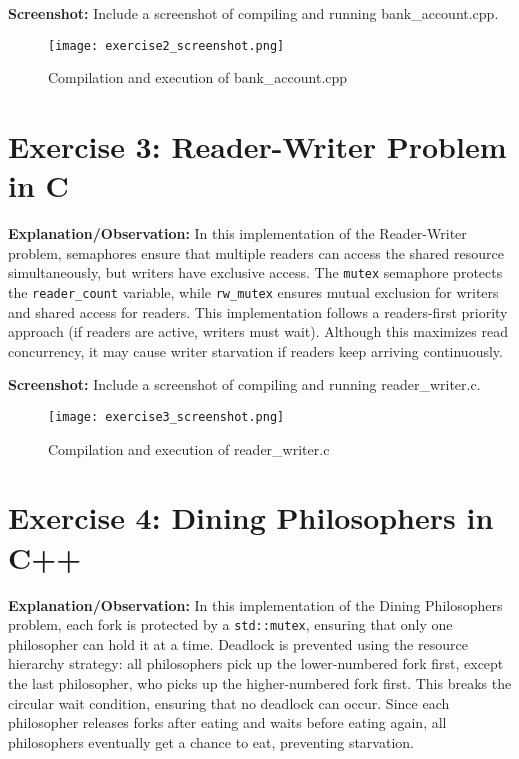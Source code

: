 \documentclass{article}
\begin{document}
\textbf{Screenshot:} Include a screenshot of compiling and running bank\_account.cpp.
\begin{figure}[h]
\centering
\texttt{[image: exercise2\_screenshot.png]}
\caption{Compilation and execution of bank\_account.cpp}
\end{figure}

\section{Exercise 3: Reader-Writer Problem in C}


\textbf{Explanation/Observation:}  
In this implementation of the Reader-Writer problem, semaphores ensure that multiple readers can access the shared resource simultaneously, but writers have exclusive access. The \texttt{mutex} semaphore protects the \texttt{reader\_count} variable, while \texttt{rw\_mutex} ensures mutual exclusion for writers and shared access for readers. This implementation follows a readers-first priority approach (if readers are active, writers must wait). Although this maximizes read concurrency, it may cause writer starvation if readers keep arriving continuously.

\textbf{Screenshot:} Include a screenshot of compiling and running reader\_writer.c.
\begin{figure}[h]
\centering
\texttt{[image: exercise3\_screenshot.png]}
\caption{Compilation and execution of reader\_writer.c}
\end{figure}

\section{Exercise 4: Dining Philosophers in C++}


\textbf{Explanation/Observation:}  
In this implementation of the Dining Philosophers problem, each fork is protected by a \texttt{std::mutex}, ensuring that only one philosopher can hold it at a time. Deadlock is prevented using the resource hierarchy strategy: all philosophers pick up the lower-numbered fork first, except the last philosopher, who picks up the higher-numbered fork first. This breaks the circular wait condition, ensuring that no deadlock can occur. Since each philosopher releases forks after eating and waits before eating again, all philosophers eventually get a chance to eat, preventing starvation.
\end{document}
